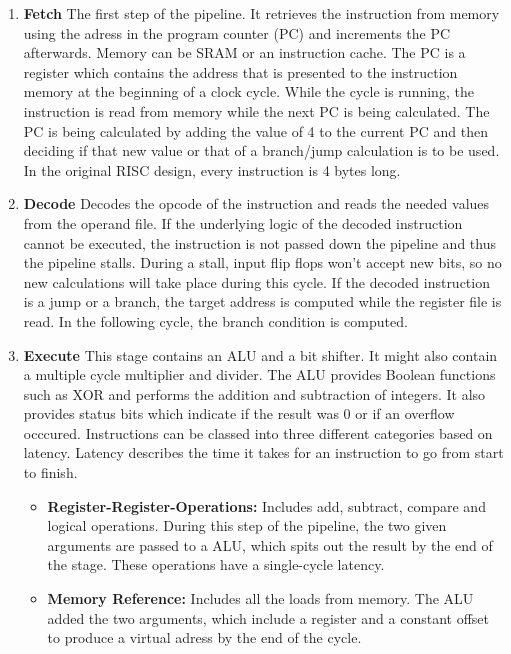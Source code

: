 \begin{enumerate} %
  \item \textbf{Fetch} The first step of the pipeline.
  It retrieves the instruction from memory using the adress in the program counter (PC) and increments the PC afterwards.
  Memory can be SRAM or an instruction cache.
  The PC is a register which contains the address that is presented to the instruction memory at the beginning of a clock cycle.
  While the cycle is running, the instruction is read from memory while the next PC is being calculated.
  The PC is being calculated by adding the value of 4 to the current PC and then deciding if that new value or that of a branch/jump calculation is to be used.
  In the original RISC design, every instruction is 4 bytes long.
  \item \textbf{Decode} Decodes the opcode of the instruction and reads the needed values from the operand file.
  If the underlying logic of the decoded instruction cannot be executed, the instruction is not passed down the pipeline and thus the pipeline stalls.
  During a stall, input flip flops won't accept new bits, so no new calculations will take place during this cycle.
  If the decoded instruction is a jump or a branch, the target address is computed while the register file is read.
  In the following cycle, the branch condition is computed.
  \item \textbf{Execute} This stage contains an ALU and a bit shifter.
  It might also contain a multiple cycle multiplier and divider.
    The ALU provides Boolean functions such as XOR and performs the addition and subtraction of integers.
    It also provides status bits which indicate if the result was 0 or if an overflow occcured.
    Instructions can be classed into three different categories based on latency.
    Latency describes the time it takes for an instruction to go from start to finish.
    \begin{itemize}
      \item \textbf{Register-Register-Operations:} Includes add, subtract, compare and logical operations.
        During this step of the pipeline, the two given arguments are passed to a ALU, which spits out the result by the end of the stage.
        These operations have a single-cycle latency.
      \item \textbf{Memory Reference:} Includes all the loads from memory.
        The ALU added the two arguments, which include a register and a constant offset to produce a virtual adress by the end of the cycle.

\end{itemize}
\end{enumerate}
